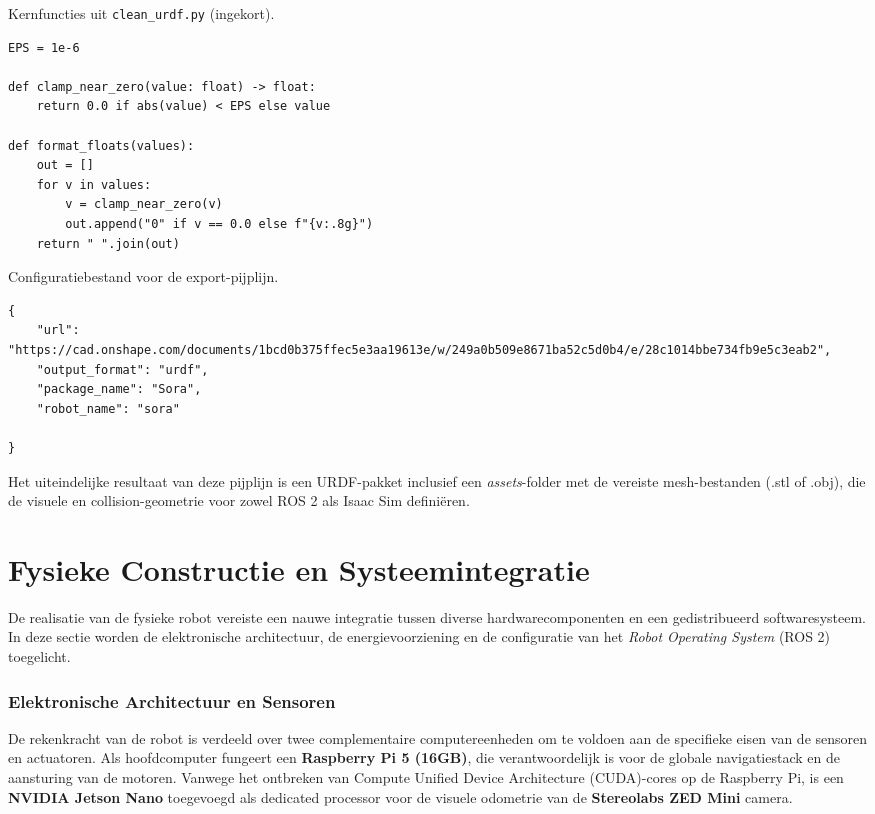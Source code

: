 \begin{listing}[h]
\caption{Kernfuncties uit \texttt{clean\_urdf.py} (ingekort).}
\label{lst:clean-urdf-snippet}
\begin{verbatim}
EPS = 1e-6

def clamp_near_zero(value: float) -> float:
    return 0.0 if abs(value) < EPS else value

def format_floats(values):
    out = []
    for v in values:
        v = clamp_near_zero(v)
        out.append("0" if v == 0.0 else f"{v:.8g}")
    return " ".join(out)
\end{verbatim}
\end{listing}

\begin{listing}[h]
\caption{Configuratiebestand voor de export-pijplijn.}
\begin{verbatim}
{
    "url": "https://cad.onshape.com/documents/1bcd0b375ffec5e3aa19613e/w/249a0b509e8671ba52c5d0b4/e/28c1014bbe734fb9e5c3eab2",
    "output_format": "urdf",
    "package_name": "Sora",
    "robot_name": "sora"

}
\end{verbatim}
\end{listing}

Het uiteindelijke resultaat van deze pijplijn is een URDF-pakket inclusief een \textit{assets}-folder met de vereiste mesh-bestanden (.stl of .obj), die de visuele en collision-geometrie voor zowel ROS 2 als Isaac Sim definiëren.

\section{Fysieke Constructie en Systeemintegratie}
De realisatie van de fysieke robot vereiste een nauwe integratie tussen diverse hardwarecomponenten en een gedistribueerd softwaresysteem. In deze sectie worden de elektronische architectuur, de energievoorziening en de configuratie van het \textit{Robot Operating System} (ROS 2) toegelicht.

\subsubsection{Elektronische Architectuur en Sensoren}
\label{sec:fysieke_constructie}
De rekenkracht van de robot is verdeeld over twee complementaire computereenheden om te voldoen aan de specifieke eisen van de sensoren en actuatoren. Als hoofdcomputer fungeert een \textbf{Raspberry Pi 5 (16GB)}, die verantwoordelijk is voor de globale navigatiestack en de aansturing van de motoren. Vanwege het ontbreken van Compute Unified Device Architecture (CUDA)-cores op de Raspberry Pi, is een \textbf{NVIDIA Jetson Nano} toegevoegd als dedicated processor voor de visuele odometrie van de \textbf{Stereolabs ZED Mini} camera.

